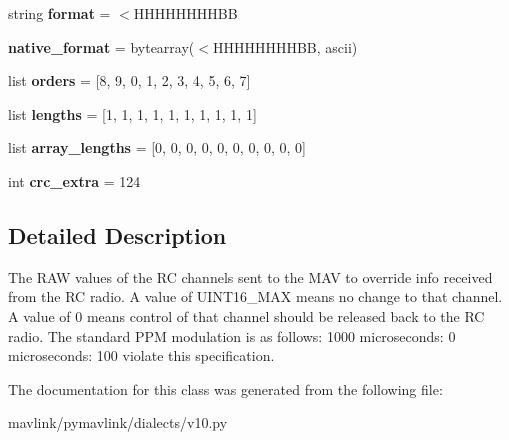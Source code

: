 \begin{DoxyCompactItemize}
\item 
\mbox{\label{classpymavlink_1_1dialects_1_1v10_1_1MAVLink__rc__channels__override__message_a5c7d3ba82776242bb9d910a4f614f292}} 
string {\bfseries format} = \textquotesingle{}$<$H\+H\+H\+H\+H\+H\+H\+H\+BB\textquotesingle{}
\item 
\mbox{\label{classpymavlink_1_1dialects_1_1v10_1_1MAVLink__rc__channels__override__message_a48c6138f36f0ab77b3ffd3f0f37d12dd}} 
{\bfseries native\+\_\+format} = bytearray(\textquotesingle{}$<$H\+H\+H\+H\+H\+H\+H\+H\+BB\textquotesingle{}, \textquotesingle{}ascii\textquotesingle{})
\item 
\mbox{\label{classpymavlink_1_1dialects_1_1v10_1_1MAVLink__rc__channels__override__message_a3d627cd22b6c3c851f2b5bb3089714bb}} 
list {\bfseries orders} = \mbox{[}8, 9, 0, 1, 2, 3, 4, 5, 6, 7\mbox{]}
\item 
\mbox{\label{classpymavlink_1_1dialects_1_1v10_1_1MAVLink__rc__channels__override__message_a7986aa36e82416ec8b674693f103c13b}} 
list {\bfseries lengths} = \mbox{[}1, 1, 1, 1, 1, 1, 1, 1, 1, 1\mbox{]}
\item 
\mbox{\label{classpymavlink_1_1dialects_1_1v10_1_1MAVLink__rc__channels__override__message_a6589ea749dc8c9a99bf27efdbbef5dc0}} 
list {\bfseries array\+\_\+lengths} = \mbox{[}0, 0, 0, 0, 0, 0, 0, 0, 0, 0\mbox{]}
\item 
\mbox{\label{classpymavlink_1_1dialects_1_1v10_1_1MAVLink__rc__channels__override__message_a60c9460adb1796bffd6280b89ceed498}} 
int {\bfseries crc\+\_\+extra} = 124
\end{DoxyCompactItemize}


\subsection{Detailed Description}
\begin{DoxyVerb}The RAW values of the RC channels sent to the MAV to override
info received from the RC radio. A value of UINT16_MAX means
no change to that channel. A value of 0 means control of that
channel should be released back to the RC radio. The standard
PPM modulation is as follows: 1000 microseconds: 0%
microseconds: 100%
violate this specification.
\end{DoxyVerb}
 

The documentation for this class was generated from the following file\+:\begin{DoxyCompactItemize}
\item 
mavlink/pymavlink/dialects/v10.\+py\end{DoxyCompactItemize}
